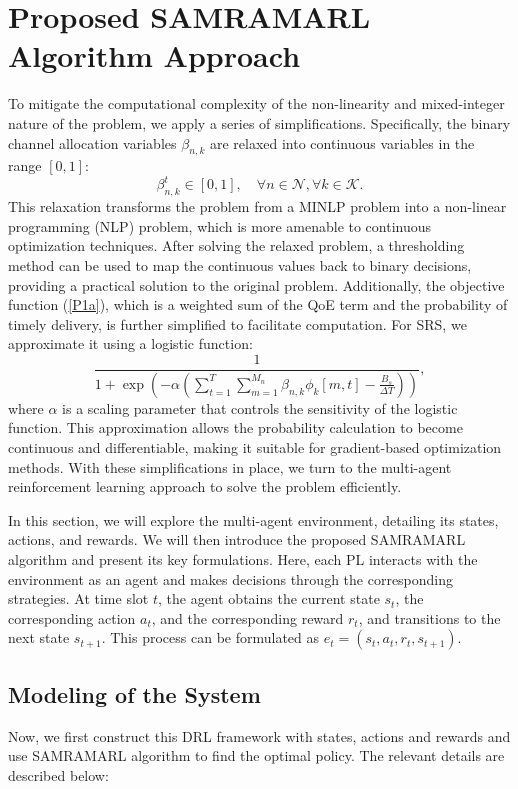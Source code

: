 \documentclass[10pt, lettersize,journal]{IEEEtran}
\begin{document}
	\section{Proposed SAMRAMARL Algorithm Approach}
	To mitigate the computational complexity of the non-linearity and mixed-integer nature of the problem, we apply a series of simplifications. Specifically, the binary channel allocation variables ${{\beta _{n,k}}}$ are relaxed into continuous variables in the range $[0,1]$:
	\begin{equation}\label{P1h1} \beta _{n,k}^t \in [0,1], \quad \forall n \in \mathcal N, \forall k \in \mathcal K. \end{equation}
	This relaxation transforms the problem from a MINLP problem into a non-linear programming (NLP) problem, which is more amenable to continuous optimization techniques. After solving the relaxed problem, a thresholding method can be used to map the continuous values back to binary decisions, providing a practical solution to the original problem.
	Additionally, the objective function (\ref{P1a}), which is a weighted sum of the QoE term and the probability of timely delivery, is further simplified to facilitate computation. For SRS, we approximate it using a logistic function:
	\begin{equation}\label{P1h2} \frac{1}{{1 + \exp( - \alpha (\sum\limits_{t = 1}^T {\sum\limits_{m = 1}^{M_{n}} {{\beta _{n,k}}} } \phi _k[m,t] - \frac{{{B_s}}}{{\Delta T}}))}}, 
	\end{equation}
	where $\alpha$ is a scaling parameter that controls the sensitivity of the logistic function. This approximation allows the probability calculation to become continuous and differentiable, making it suitable for gradient-based optimization methods.
	With these simplifications in place, we turn to the multi-agent reinforcement learning approach to solve the problem efficiently.
	
	In this section, we will explore the multi-agent environment, detailing its states, actions, and rewards. We will then introduce the proposed SAMRAMARL algorithm and present its key formulations. Here, each PL interacts with the environment as an agent and makes decisions through the corresponding strategies. At time slot $t$, the agent obtains the current state $s_t$, the corresponding action $a_t$, and the corresponding reward $r_t$, and transitions to the next state $s_{t+1}$. This process can be formulated as ${e_t} = ({s_t},{a_t},{r_t},{s_{t + 1}})$.
	
	\subsection{Modeling of the System}
	Now, we first construct this DRL framework with states, actions and rewards and use SAMRAMARL algorithm to find the optimal policy. The relevant details are described below:
	
\end{document}

